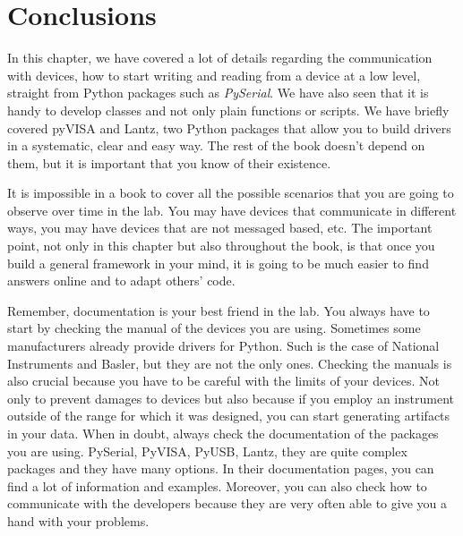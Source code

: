 

\section{Conclusions}\label{section:conclusions}
In this chapter, we have covered a lot of details regarding the
communication with devices, how to start writing and reading from a
device at a low level, straight from Python packages such as
\emph{PySerial}. We have also seen that it is handy to develop classes
and not only plain functions or scripts. We have briefly covered pyVISA and Lantz,
two Python packages that allow you to build drivers in a systematic, clear
and easy way. The rest of the book doesn't depend on them, but it is important that you know of their existence. 

It is impossible in a book to cover all the possible scenarios that you
are going to observe over time in the lab. You may have devices that
communicate in different ways, you may have devices that are not
messaged based, etc. The important point, not only in this chapter but
also throughout the book, is that once you build a general framework in
your mind, it is going to be much easier to find answers online and to
adapt others' code.

Remember, documentation is your best friend in the lab. You always have
to start by checking the manual of the devices you are using. Sometimes some manufacturers already provide drivers for Python. Such is the case of National Instruments and Basler, but they are not the only ones. Checking the manuals is also crucial because you have
to be careful with the limits of your devices. Not only to prevent damages to devices but also because if you employ an instrument
outside of the range for which it was designed, you can start generating
artifacts in your data. When in doubt, always check the documentation of the
packages you are using. PySerial, PyVISA, PyUSB, Lantz, they are quite complex
packages and they have many options. In their documentation pages, you
can find a lot of information and examples. Moreover, you can also check
how to communicate with the developers because they are very often able to give you a hand with your problems. 

